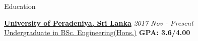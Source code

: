 \documentclass{resume} %
\begin{document}
\begin{rSection}{Education}

{\bf \href{http://eng.pdn.ac.lk}{University of Peradeniya, Sri Lanka}} \hfill {\em 2017 Nov - Present} 
\\ \href{http://eng.pdn.ac.lk/deee/academic/undergraduate.php}{Undergraduate in BSc. Engineering(Hons.)} \hfill {\bf  GPA: 3.6/4.00}


\end{rSection}





\end{document}
